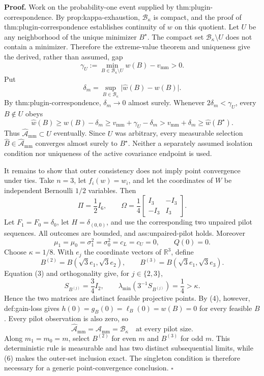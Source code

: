 \textbf{Proof.}
Work on the probability-one event supplied by thm:plugin-correspondence.  By prop:kappa-exhaustion, \(\mathcal B_\kappa\) is compact, and the proof of thm:plugin-correspondence establishes continuity of \(w\) on this quotient.  Let \(U\) be any neighborhood of the unique minimizer \(B^\star\).  The compact set \(\mathcal B_\kappa\setminus U\) does not contain a minimizer.  Therefore the extreme-value theorem and uniqueness give the derived, rather than assumed, gap
\[
 \gamma_U:=
 \min_{B\in\mathcal B_\kappa\setminus U}w(B)-v_{\mathrm{mm}}>0.
 \tag{1}
\]
Put
\[
 \delta_m=
 \sup_{B\in\mathcal B_\kappa}\lvert\widehat w(B)-w(B)\rvert.
\]
By thm:plugin-correspondence, \(\delta_m\longrightarrow0\) almost surely.  Whenever \(2\delta_m<\gamma_U\), every \(B\notin U\) obeys
\[
 \widehat w(B)
 \ge w(B)-\delta_m
 \ge v_{\mathrm{mm}}+\gamma_U-\delta_m
 >v_{\mathrm{mm}}+\delta_m
 \ge\widehat w(B^\star).
 \tag{2}
\]
Thus \(\widehat{\mathcal A}_{\mathrm{mm}}\subset U\) eventually.  Since \(U\) was arbitrary, every measurable selection \(\widehat B\in\widehat{\mathcal A}_{\mathrm{mm}}\) converges almost surely to \(B^\star\).  Neither a separately assumed isolation condition nor uniqueness of the active covariance endpoint is used.

It remains to show that outer consistency does not imply point convergence under ties.  Take \(n=3\), let \(f_i(w)=w_i\), and let the coordinates of \(W\) be independent Bernoulli \(1/2\) variables.  Then
\[
 \Pi=\frac12I_6,
 \qquad
 \Omega=\frac14
 \begin{bmatrix}I_3&-I_3\\-I_3&I_3\end{bmatrix}.
 \tag{3}
\]
Let \(F_1=F_0=\delta_0\), let \(H=\delta_{(0,0)}\), and use the corresponding two unpaired pilot sequences.  All outcomes are bounded, and ass:unpaired-pilot holds.  Moreover
\[
 \mu_1=\mu_0=\sigma_1^2=\sigma_0^2=c_L=c_U=0,
 \qquad Q(0)=0.
 \tag{4}
\]
Choose \(\kappa=1/8\).  With \(e_j\) the coordinate vectors of \(\mathbb R^3\), define
\[
 B^{(2)}=B(\sqrt3e_1,\sqrt3e_2),
 \qquad
 B^{(3)}=B(\sqrt3e_1,\sqrt3e_3).
\]
Equation (3) and orthogonality give, for \(j\in\{2,3\}\),
\[
 S_{B^{(j)}}=\frac34I_2,
 \qquad
 \lambda_{\min}\!\left(3^{-1}S_{B^{(j)}}\right)=\frac14>\kappa.
 \tag{5}
\]
Hence the two matrices are distinct feasible projective points.  By (4), however, def:gain-loss gives \(h(0)=g_B(0)=\ell_B(0)=w(B)=0\) for every feasible \(B\).  Every pilot observation is also zero, so
\[
 \widehat{\mathcal A}_{\mathrm{mm}}
 =\mathcal A_{\mathrm{mm}}
 =\mathcal B_\kappa
 \quad\text{at every pilot size}.
 \tag{6}
\]
Along \(m_1=m_0=m\), select \(B^{(2)}\) for even \(m\) and \(B^{(3)}\) for odd \(m\).  This deterministic rule is measurable and has two distinct subsequential limits, while (6) makes the outer-set inclusion exact.  The singleton condition is therefore necessary for a generic point-convergence conclusion. \(\square\)